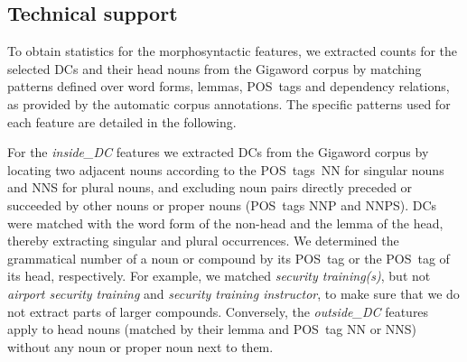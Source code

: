 \documentclass[output=paper]{langsci/langscibook}
\begin{document}
\subsection{Technical support}\label{sec:technical:features}

To obtain statistics for the morphosyntactic features, we extracted counts for the selected DCs and their head nouns from the Gigaword corpus by matching patterns defined over word forms, lemmas, POS~tags and dependency relations, as provided by the automatic corpus annotations.
The specific patterns used for each feature are detailed in the following.

For the \textit{inside\_DC} features we extracted DCs from the Gigaword corpus by locating two adjacent nouns according to the POS~tags~NN for singular nouns and NNS for plural nouns, and  {excluding noun pairs directly preceded or succeeded by other} nouns or proper nouns (POS~tags NNP and NNPS). DCs were matched with the word form of the non-head and the lemma of the head, thereby extracting singular and plural occurrences.
We determined the grammatical number of a noun or compound by its POS~tag or the POS~tag of its head, respectively.
For example, we matched \emph{security training(s)}, but not \emph{airport security training} and \emph{security training instructor}, to make sure that we do not extract parts of larger compounds. Conversely,  the \textit{outside\_DC} features apply to head nouns (matched by their lemma and POS~tag NN or NNS) without any noun or proper noun next to them.
\end{document}
